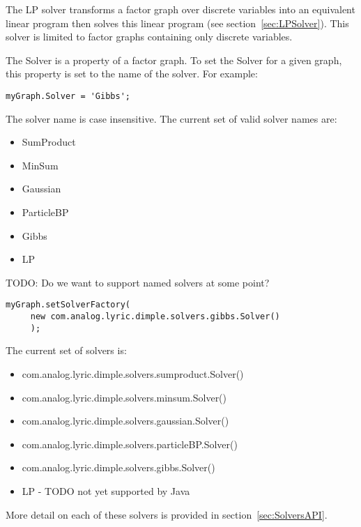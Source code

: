 The LP solver transforms a factor graph over discrete variables into an equivalent linear program then solves this linear program (see section~\ref{sec:LPSolver}).  This solver is limited to factor graphs containing only discrete variables.

The Solver is a property of a factor graph.  To set the Solver for a given graph, this property is set to the name of the solver.  For example:

\ifmatlab

\begin{lstlisting}
myGraph.Solver = 'Gibbs';
\end{lstlisting}

The solver name is case insensitive.  The current set of valid solver names are:

\begin{itemize}
\item SumProduct
\item MinSum
\item Gaussian
\item ParticleBP
\item Gibbs
\item LP
\end{itemize}

\fi

\ifjava

TODO: Do we want to support named solvers at some point?

\begin{lstlisting}
myGraph.setSolverFactory(
     new com.analog.lyric.dimple.solvers.gibbs.Solver()
     );
\end{lstlisting}

The current set of solvers is:

\begin{itemize}
\item com.analog.lyric.dimple.solvers.sumproduct.Solver()
\item com.analog.lyric.dimple.solvers.minsum.Solver()
\item com.analog.lyric.dimple.solvers.gaussian.Solver()
\item com.analog.lyric.dimple.solvers.particleBP.Solver()
\item com.analog.lyric.dimple.solvers.gibbs.Solver()
\item LP - TODO not yet supported by Java
\end{itemize}

\fi

More detail on each of these solvers is provided in section~\ref{sec:SolversAPI}.

